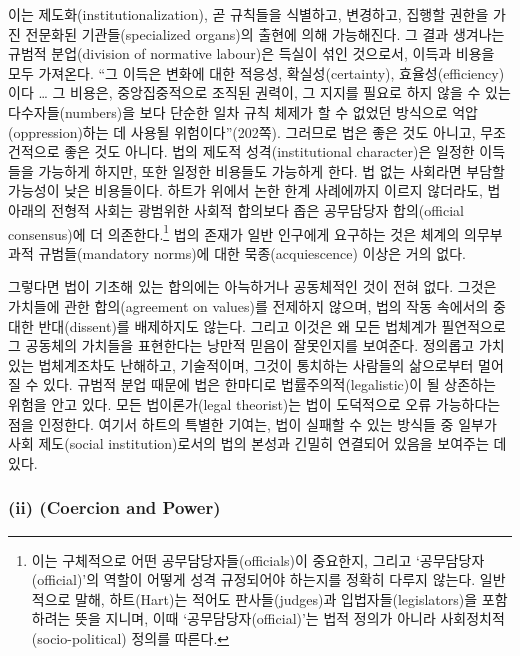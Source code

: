 이는 제도화(institutionalization), 곧 규칙들을 식별하고, 변경하고,
집행할 권한을 가진 전문화된 기관들(specialized organs)의 출현에 의해
가능해진다. 그 결과 생겨나는 규범적 분업(division of normative labour)은
득실이 섞인 것으로서, 이득과 비용을 모두 가져온다. “그 이득은 변화에
대한 적응성, 확실성(certainty), 효율성(efficiency)이다 \ldots{} 그
비용은, 중앙집중적으로 조직된 권력이, 그 지지를 필요로 하지 않을 수 있는
다수자들(numbers)을 보다 단순한 일차 규칙 체제가 할 수 없었던 방식으로
억압(oppression)하는 데 사용될 위험이다”(202쪽). 그러므로 법은
 좋은 것도 아니고, 무조건적으로 좋은 것도 아니다. 법의
제도적 성격(institutional character)은 일정한 이득들을 가능하게 하지만,
또한 일정한 비용들도 가능하게 한다. 법 없는 사회라면 부담할 가능성이
낮은 비용들이다. 하트가 위에서 논한 한계 사례에까지 이르지 않더라도, 법
아래의 전형적 사회는 광범위한 사회적 합의보다 좁은 공무담당자
합의(official consensus)에 더 의존한다.\footnote{이는 구체적으로 어떤
  공무담당자들(officials)이 중요한지, 그리고 ‘공무담당자(official)’의
  역할이 어떻게 성격 규정되어야 하는지를 정확히 다루지 않는다.
  일반적으로 말해, 하트(Hart)는 적어도 판사들(judges)과
  입법자들(legislators)을 포함하려는 뜻을 지니며, 이때
  ‘공무담당자(official)’는 법적 정의가 아니라
  사회정치적(socio-political) 정의를 따른다.} 법의 존재가 일반 인구에게
요구하는 것은 체계의 의무부과적 규범들(mandatory norms)에 대한
묵종(acquiescence) 이상은 거의 없다.

그렇다면 법이 기초해 있는 합의에는 아늑하거나 공동체적인 것이 전혀 없다.
그것은 가치들에 관한 합의(agreement on values)를 전제하지 않으며, 법의
작동 속에서의 중대한 반대(dissent)를 배제하지도 않는다. 그리고 이것은 왜
모든 법체계가 필연적으로 그 공동체의 가치들을 표현한다는 낭만적 믿음이
잘못인지를 보여준다. 정의롭고 가치 있는 법체계조차도 난해하고,
기술적이며, 그것이 통치하는 사람들의 삶으로부터 멀어질 수 있다. 규범적
분업 때문에 법은 한마디로 법률주의적(legalistic)이 될 상존하는 위험을
안고 있다. 모든 법이론가(legal theorist)는 법이 도덕적으로 오류
가능하다는 점을 인정한다. 여기서 하트의 특별한 기여는, 법이 실패할 수
있는 방식들 중 일부가 사회 제도(social institution)로서의 법의 본성과
긴밀히 연결되어 있음을 보여주는 데 있다.

\subsubsection{\texorpdfstring{(ii)  (Coercion and
Power)}{(ii) 강제와 권력 (Coercion and Power)}}\label{ii-uxac15uxc81cuxc640-uxad8cuxb825-coercion-and-power}


